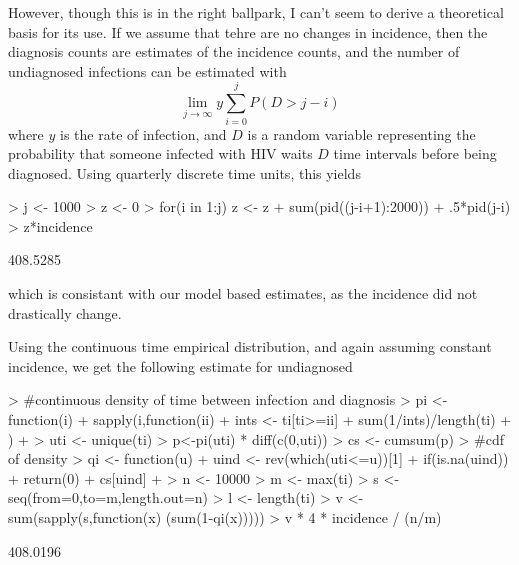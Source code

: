 \documentclass{article}
\begin{document}
However, though this is in the right ballpark, I can't seem to derive a theoretical basis for its use. If we assume that tehre are no changes in incidence, then the diagnosis counts are estimates of the incidence counts, and the number of undiagnosed infections can be estimated with 
$$
\lim_{j \to \infty} y \sum_{i=0}^jP(D > j-i)
$$
where $y$ is the rate of infection, and $D$ is a random variable representing the probability that someone infected with HIV waits $D$ time intervals before being diagnosed. Using quarterly discrete time units, this yields
\begin{Schunk}
\begin{Sinput}
> j <- 1000
> z <- 0
> for(i in 1:j) z <- z + sum(pid((j-i+1):2000)) + .5*pid(j-i)
> z*incidence
\end{Sinput}
\begin{Soutput}
[1] 408.5285
\end{Soutput}
\end{Schunk}
which is consistant with our model based estimates, as the incidence did not drastically change.

Using the continuous time empirical distribution, and again assuming constant incidence, we get the following estimate for undiagnosed
\begin{Schunk}
\begin{Sinput}
> #continuous density of time between infection and diagnosis
> pi <- function(i){
+   sapply(i,function(ii){
+     ints <- ti[ti>=ii]
+     sum(1/ints)/length(ti)
+   })
+ }
> uti <- unique(ti)
> p<-pi(uti) * diff(c(0,uti))
> cs <- cumsum(p)
> #cdf of density
> qi <- function(u){
+   uind <- rev(which(uti<=u))[1]
+   if(is.na(uind))
+     return(0)
+   cs[uind]
+ }
> n <- 10000
> m <- max(ti)
> s <- seq(from=0,to=m,length.out=n)
> l <- length(ti)
> v <- sum(sapply(s,function(x) (sum(1-qi(x)))))
> v * 4 * incidence / (n/m)
\end{Sinput}
\begin{Soutput}
[1] 408.0196
\end{Soutput}
\end{Schunk}
\end{document}
